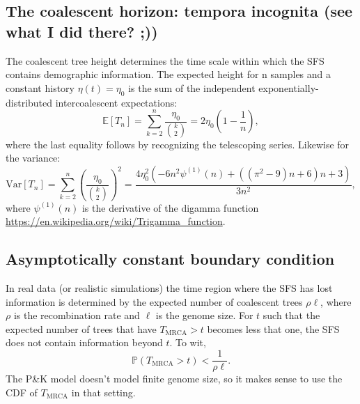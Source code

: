 \documentclass[11pt]{article}
\DeclareMathOperator{\erf}{erf}
\begin{document}
\subsection*{The coalescent horizon: tempora incognita (see what I did there? ;))}\label{sec:model:horizon}

The coalescent tree height determines the time scale within which the SFS contains demographic information.
The expected height for n samples and a constant history $\eta(t)=\eta_0$ is the sum of the independent exponentially-distributed intercoalescent expectations:
\[
\mathbb{E}[T_n] = \sum_{k=2}^n \frac{\eta_0}{\binom{k}{2}} = 2\eta_0\left(1-\frac{1}{n}\right),
\]
where the last equality follows by recognizing the telescoping series.
Likewise for the variance:
\[
\text{Var}[T_n] = \sum_{k=2}^n \left(\frac{\eta_0}{\binom{k}{2}}\right)^2 = \frac{4 \eta _0^2 \left(-6 n^2 \psi ^{(1)}(n)+\left(\left(\pi ^2-9\right) n+6\right) n+3\right)}{3 n^2},
\]
where $\psi ^{(1)}(n)$ is the derivative of the digamma function \url{https://en.wikipedia.org/wiki/Trigamma_function}.


\subsection*{Asymptotically constant boundary condition}\label{sec:model:boundary}

In real data (or realistic simulations) the time region where the SFS has lost information is determined by the expected number of coalescent trees $\rho\ell$, where $\rho$ is the recombination rate and $\ell$ is the genome size.
For $t$ such that the expected number of trees that have $T_{\text{MRCA}} > t$ becomes less that one, the SFS does not contain information beyond $t$.
To wit,
\[
\mathbb{P}\left(T_{\text{MRCA}}>t\right) < \frac{1}{\rho \ell}.
\]
The P\&K model doesn't model finite genome size, so it makes sense to use the CDF of $T_{\text{MRCA}}$ in that setting.


\end{document}
